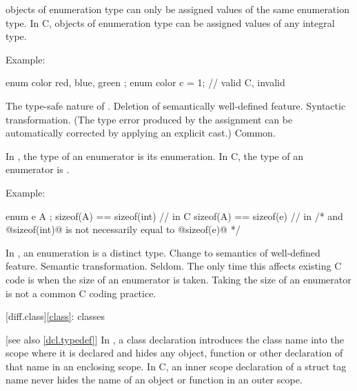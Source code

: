 \change
\Cpp{} objects of enumeration type can only be assigned values of the same enumeration type.
In C, objects of enumeration type can be assigned values of any integral type.

Example:
\begin{codeblock}
enum color { red, blue, green };
enum color c = 1;               // valid C, invalid \Cpp{}
\end{codeblock}

\rationale
The type-safe nature of \Cpp{}.
\effect
Deletion of semantically well-defined feature.
\difficulty
Syntactic transformation.
(The type error produced by the assignment can be automatically
corrected by applying an explicit cast.)
\howwide
Common.

\change
In \Cpp{}, the type of an enumerator is its enumeration. In C, the type of an enumerator is .

Example:
\begin{codeblock}
enum e { A };
sizeof(A) == sizeof(int)        // in C
sizeof(A) == sizeof(e)          // in \Cpp{}
/* and @sizeof(int)@ is not necessarily equal to @sizeof(e)@ */
\end{codeblock}

\rationale
In \Cpp{}, an enumeration is a distinct type.
\effect
Change to semantics of well-defined feature.
\difficulty
Semantic transformation.
\howwide
Seldom.
The only time this affects existing C code is when the size of an
enumerator is taken.
Taking the size of an enumerator is not a
common C coding practice.

[diff.class]{\ref{class}: classes}

 [see also \ref{dcl.typedef}]
\change
In \Cpp{}, a class declaration introduces the class name into the scope where it is
declared and hides any object, function or other declaration of that name in an enclosing
scope. In C, an inner scope declaration of a struct tag name never hides the name of an
object or function in an outer scope.

